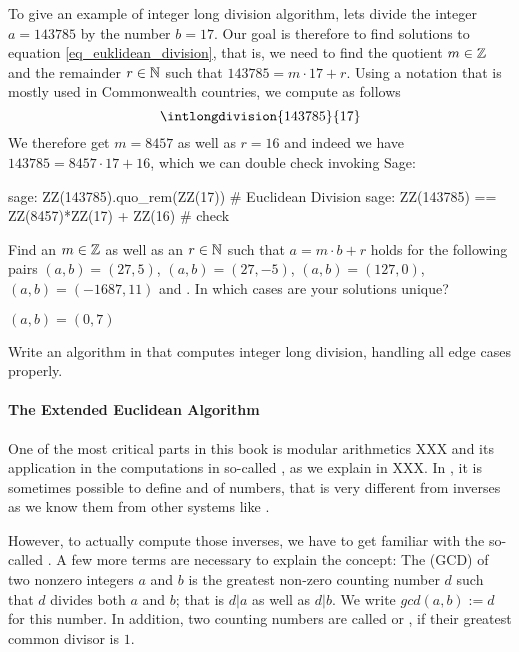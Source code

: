 \begin{example} To give an example of integer long division algorithm, lets divide the integer $a=143785$ by the number $b=17$. Our goal is therefore to find solutions to equation \ref{eq_euklidean_division}, that is, we need to find the quotient $m\in\mathbb{Z}$ and the remainder $r \in \mathbb{N}$ such that $143785 = m\cdot 17 + r$. Using a notation that is mostly used in Commonwealth countries, we compute as follows
\begin{equation}
\intlongdivision{143785}{17}
\end{equation}
We therefore get $m=8457$ as well as $r=16$ and indeed we have $143785 = 8457\cdot 17 + 16$, which we can double check invoking Sage:
\begin{sagecommandline}
sage: ZZ(143785).quo_rem(ZZ(17)) # Euclidean Division
sage: ZZ(143785) == ZZ(8457)*ZZ(17) + ZZ(16) # check
\end{sagecommandline}

\end{example}
\begin{exercise}
Find an $m\in\mathbb{Z}$ as well as an $r\in\mathbb{N}$ such that $a= m\cdot b +r$ holds for the following pairs $(a,b) = (27,5)$, $(a,b)=(27,-5)$, $(a,b)=(127,0)$, $(a,b)= (-1687, 11)$ and . In which cases are your solutions unique?
\end{exercise}$(a,b)= (0, 7)$
\begin{exercise}
Write an algorithm in  that computes integer long division, handling all edge cases properly.
\end{exercise}

\paragraph{The Extended Euclidean Algorithm}
One of the most critical parts in this book is modular arithmetics XXX and its application in the computations in so-called , as we explain in XXX. In , it is sometimes possible to define  and  of numbers, that is very different from inverses as we know them from other systems like . 

However, to actually compute those inverses, we have to get familiar with the so-called . A few more terms are necessary to explain the concept: The  (GCD) of two nonzero integers $a$ and $b$ is the greatest non-zero counting number $d$ such that $d$ divides both $a$ and $b$; that is $d|a$ as well as $d|b$. We write $ gcd (a, b):=d $ for this number. In addition, two counting numbers are called  or , if their greatest common divisor is $1$.

